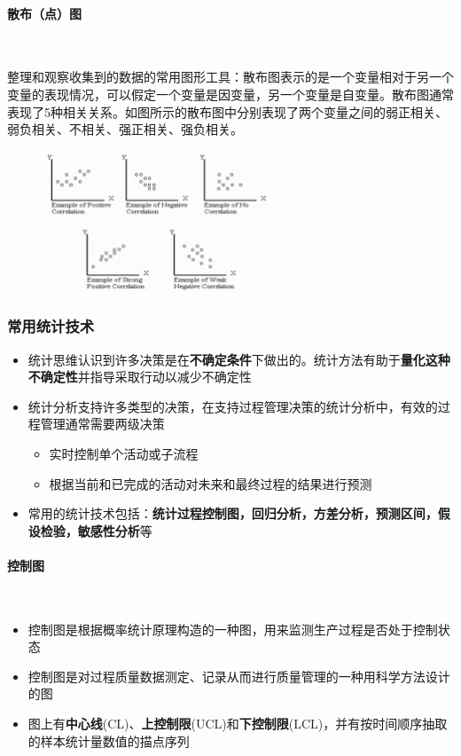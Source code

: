 \paragraph{散布（点）图}~{} \par
整理和观察收集到的数据的常用图形工具：散布图表示的是一个变量相对于另一个变量的表现情况，可以假定一个变量是因变量，另一个变量是自变量。散布图通常表现了5种相关关系。如图所示的散布图中分别表现了两个变量之间的弱正相关、弱负相关、不相关、强正相关、强负相关。
\begin{figure}[H]
    \vspace{-0.5em}
	\centering
	\includegraphics[width=0.6\textwidth]{images/散布图.png}
    \vspace{-1em}
\end{figure}

\subsubsection{常用统计技术}
\begin{itemize}
    \item 统计思维认识到许多决策是在\textbf{不确定条件}下做出的。统计方法有助于\textbf{量化这种不确定性}并指导采取行动以减少不确定性
    \item 统计分析支持许多类型的决策，在支持过程管理决策的统计分析中，有效的过程管理通常需要两级决策
    \begin{itemize}
        \item 实时控制单个活动或子流程
        \item 根据当前和已完成的活动对未来和最终过程的结果进行预测
    \end{itemize}
    \item 常用的统计技术包括：\textbf{统计过程控制图，回归分析，方差分析，预测区间，假设检验，敏感性分析}等
\end{itemize}


\paragraph{控制图}~{} \par
\begin{itemize}
    \item 控制图是根据概率统计原理构造的一种图，用来监测生产过程是否处于控制状态
    \item 控制图是对过程质量数据测定、记录从而进行质量管理的一种用科学方法设计的图
    \item 图上有\textbf{中心线}(CL)、\textbf{上控制限}(UCL)和\textbf{下控制限}(LCL)，并有按时间顺序抽取的样本统计量数值的描点序列
\end{itemize}

